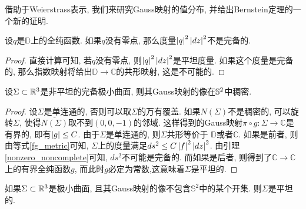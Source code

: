 借助于Weierstrass表示, 我们来研究Gauss映射的值分布, 并给出Bernstein定理的一个新的证明.
\begin{lemma} \label{nonzero_noncomplete}
    设$q$是$\mathbb{D}$上的全纯函数. 如果$q$没有零点, 那么度量$\abs{q}^2\abs{dz}^2$不是完备的.
\end{lemma}
\begin{proof}
    直接计算可知, 若$q$没有零点, 则$\abs{q}^2\abs{dz}^2$是平坦度量. 如果这个度量是完备的, 那么指数映射将给出$\mathbb{D}\to \mathbb{C}$的共形映射, 这是不可能的.
\end{proof}
\begin{theorem}
    设$\Sigma \subset\R^3$是非平坦的完备极小曲面, 则其Gauss映射的像在$\S^2$中稠密.
\end{theorem}
\begin{proof}
    设$\Sigma$是单连通的, 否则可以取$\Sigma$的万有覆盖. 如果$N(\Sigma)$不是稠密的, 可以旋转$\Sigma$, 使得$\overline{N(\Sigma)}$取不到$(0,0,-1)$的邻域.  这样得到的Gauss映射$\pi \circ g: \Sigma \to \mathbb{C}$是有界的, 即有$\abs{g} \le C$.  由于$\Sigma$是单连通的, 则$\Sigma$共形等价于 $\mathbb{D}$或者$\mathbb{C}$. 如果是前者, 则由等式\eqref{fg_metric}可知, $\Sigma$上的度量满足$ds^2 \le C\abs{f}^2\abs{dz}^2$. 由引理\eqref{nonzero_noncomplete}可知, $ds^2$不可能是完备的. 而如果是后者, 则得到了$\mathbb{C} \to \mathbb{C}$上的有界全纯函数$g$, 而此时$g$必定为常数,这意味着$\Sigma$是平坦的.
\end{proof}
\begin{corollary}
    如果$\Sigma \subset \R^3$是极小曲面, 且其Gauss映射的像不包含$\mathbb{S}^2$中的某个开集. 则$\Sigma$是平坦的.
\end{corollary}
